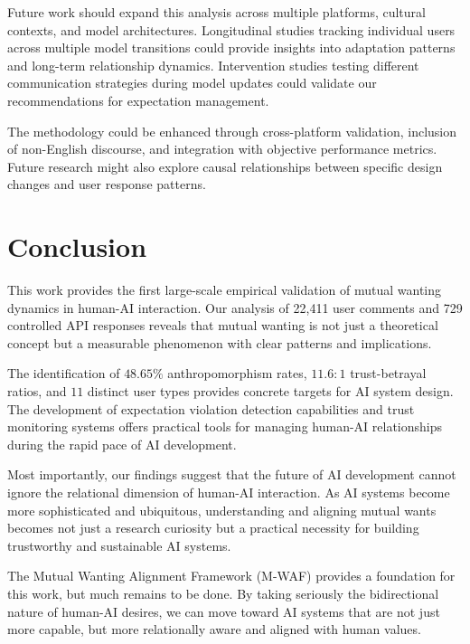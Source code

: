 \documentclass{article}
\begin{document}
Future work should expand this analysis across multiple platforms, cultural contexts, and model architectures. Longitudinal studies tracking individual users across multiple model transitions could provide insights into adaptation patterns and long-term relationship dynamics. Intervention studies testing different communication strategies during model updates could validate our recommendations for expectation management.

The methodology could be enhanced through cross-platform validation, inclusion of non-English discourse, and integration with objective performance metrics. Future research might also explore causal relationships between specific design changes and user response patterns.

\section{Conclusion}

This work provides the first large-scale empirical validation of mutual wanting dynamics in human-AI interaction. Our analysis of 22,411 user comments and 729 controlled API responses reveals that mutual wanting is not just a theoretical concept but a measurable phenomenon with clear patterns and implications.

The identification of $48.65\%$ anthropomorphism rates, $11.6:1$ trust-betrayal ratios, and $11$ distinct user types provides concrete targets for AI system design. The development of expectation violation detection capabilities and trust monitoring systems offers practical tools for managing human-AI relationships during the rapid pace of AI development.

Most importantly, our findings suggest that the future of AI development cannot ignore the relational dimension of human-AI interaction. As AI systems become more sophisticated and ubiquitous, understanding and aligning mutual wants becomes not just a research curiosity but a practical necessity for building trustworthy and sustainable AI systems.

The Mutual Wanting Alignment Framework (M-WAF) provides a foundation for this work, but much remains to be done. By taking seriously the bidirectional nature of human-AI desires, we can move toward AI systems that are not just more capable, but more relationally aware and aligned with human values.




\newpage
\end{document}
